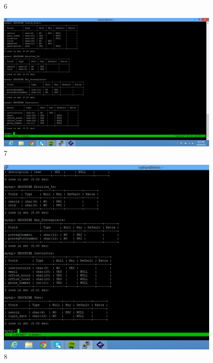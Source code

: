 \documentclass[pdftex,12pt,letter]{article}
\begin{document}
\begin{flushleft}
\begin{figure}
\figurename{ 6}
\end{figure}
\begin{figure}
\includegraphics[width=140mm]{db7.png}
\figurename{ 7}
\end{figure}
\begin{figure}
\includegraphics[width=140mm]{db8.png}
\figurename{ 8}
\end{figure}
\end{flushleft}
\end{document}
